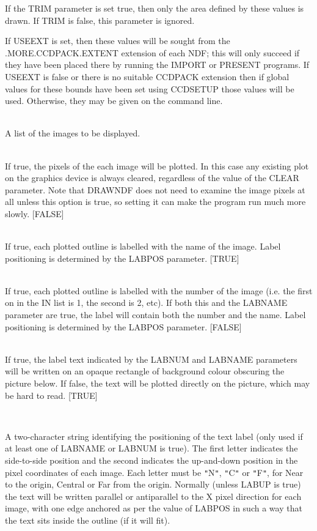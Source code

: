 \documentclass[twoside,11pt]{article}
\newcommand{\htmlref}[2]{#1}
\renewcommand{\_}{\texttt{\symbol{95}}}
\newcommand{\routine}[1]{{\sc #1}}
\newcommand{\xroutine}[1]{\htmlref{{\sc #1}}{#1}}
\newcommand{\sstsubsection}[1]{ \item[{#1}] \mbox{} \\}
\newcommand{\sstsubsection}[1]{\item[{#1}]}
\begin{document}
{{{         If the TRIM parameter is set true, then only the area defined
         by these values is drawn.  If TRIM is false, this parameter
         is ignored.

         If USEEXT is set, then these values will be sought from the
         .MORE.CCDPACK.EXTENT extension of each NDF; this will only
         succeed if they have been placed there by running the \xroutine{IMPORT}
         or \xroutine{PRESENT} programs.  If USEEXT is false or there is no
         suitable CCDPACK extension then if global values for these
         bounds have been set using \xroutine{CCDSETUP} those values will be
         used.  Otherwise, they may be given on the command line.
      }
      \sstsubsection{
         IN = LITERAL (Read)
      }{
         A list of the images to be displayed.
      }
      \sstsubsection{
         IMAGE = \_LOGICAL (Read)
      }{
         If true, the pixels of the each image will be plotted.
         In this case any existing plot on the graphics device is
         always cleared, regardless of the value of the CLEAR parameter.
         Note that \routine{DRAWNDF} does not need to examine the image pixels
         at all unless this option is true, so setting it can make
         the program run much more slowly.
         [FALSE]
      }
      \sstsubsection{
         LABNAME = \_LOGICAL (Read)
      }{
         If true, each plotted outline is labelled with the name of
         the image.  Label positioning is determined by the LABPOS
         parameter.
         [TRUE]
      }
      \sstsubsection{
         LABNUM = \_LOGICAL (Read)
      }{
         If true, each plotted outline is labelled with the number of
         the image (i.e. the first on in the IN list is 1, the second
         is 2, etc).  If both this and the LABNAME parameter are true,
         the label will contain both the number and the name.
         Label positioning is determined by the LABPOS parameter.
         [FALSE]
      }
      \sstsubsection{
         LABOPAQUE = \_LOGICAL (Read)
      }{
         If true, the label text indicated by the LABNUM and LABNAME
         parameters will be written on an opaque rectangle of background
         colour obscuring the picture below.  If false, the text will
         be plotted directly on the picture, which may be hard to read.
         [TRUE]
      }
      \sstsubsection{
         LABPOS = LITERAL (Read)
      }{
         A two-character string identifying the positioning of the text
         label (only used if at least one of LABNAME or LABNUM is
         true).  The first letter indicates the side-to-side
         position and the second indicates the up-and-down position
         in the pixel coordinates of each image.  Each letter must be
         {\tt "}N{\tt "}, {\tt "}C{\tt "} or {\tt "}F{\tt "}, for Near to the origin, Central or Far from
         the origin.  Normally (unless LABUP is true) the text
         will be written parallel or antiparallel to the X pixel
         direction for each image, with one edge anchored as per the
         value of LABPOS in such a way that the text sits inside the
         outline (if it will fit).

}}}
\end{document}
